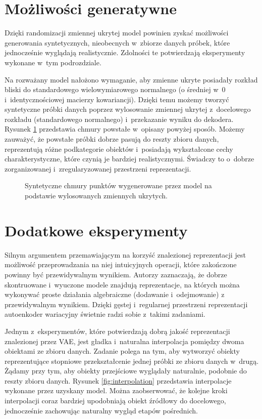 \documentclass{iithesis}
\begin{document}
\section{Możliwości generatywne}
Dzięki randomizacji zmiennej ukrytej model powinien zyskać możliwości generowania syntetycznych,
nieobecnych w~zbiorze danych próbek, które jednocześnie wyglądają realistycznie.
Zdolności te potwierdzają eksperymenty wykonane w~tym podrozdziale.

Na rozważany model nałożono wymaganie, aby zmienne ukryte posiadały rozkład
bliski do standardowego wielowymiarowego normalnego (o średniej w~0 i~identycznościowej macierzy
kowariancji). Dzięki temu możemy tworzyć syntetyczne próbki danych poprzez wylosowanie zmiennej
ukrytej z~docelowego rozkładu (standardowego normalnego) i~przekazanie wyniku do dekodera.
Rysunek \ref{fig:random_generated} przedstawia chmury powstałe w~opisany powyżej sposób.
Możemy zauważyć, że powstałe próbki dobrze pasują do reszty zbioru danych, reprezentują
różne podkategorie obiektów i~posiadają wykształcone cechy charakterystyczne,
które czynią je bardziej realistycznymi. Świadczy to o~dobrze zorganizowanej i~zregularyzowanej
przestrzeni reprezentacji.

\begin{figure}
    \caption{\label{fig:random_generated} Syntetyczne chmury punktów wygenerowane
    przez model na podstawie wylosowanych zmiennych ukrytych. }
\end{figure}

\section{Dodatkowe eksperymenty}
Silnym argumentem przemawiającym na korzyść znalezionej reprezentacji jest możliwość przeprowadzania
na niej intuicyjnych operacji, które zakończone powinny być przewidywalnym wynikiem.
Autorzy \cite{algebra_reasons} zaznaczają, że dobrze skontruowane i~wyuczone modele znajdują
reprezentacje, na których można wykonywać proste działania algebraiczne (dodawanie i~odejmowanie) z
przewidywalnym wynikiem. Dzięki gęstej i~regularnej przestrzeni reprezentacji autoenkoder
wariacyjny świetnie radzi sobie z~takimi zadaniami.

Jednym z~eksperymentów, które potwierdzają dobrą jakość reprezentacji znalezionej przez VAE,
jest gładka i~naturalna interpolacja pomiędzy dwoma obiektami ze zbioru danych.
Zadanie polega na tym, aby wytworzyć obiekty reprezentujące stopniowe przekształcenie
jednej próbki ze zbioru danych w~drugą. Żądamy przy tym, aby obiekty przejściowe wyglądały naturalnie,
podobnie do reszty zbioru danych. Rysunek \ref{fig:interpolation} przedstawia interpolacje wykonane przez uzyskany model.
Można zaobserwować, że kolejne kroki interpolacji coraz bardziej upodobniają obiekt
źródłowy do docelowego, jednocześnie zachowując naturalny wygląd etapów pośrednich.
\end{document}
